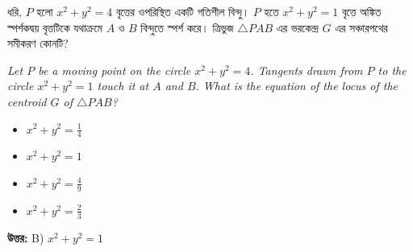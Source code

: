 \documentclass[12pt, a4paper]{article}
\begin{document}
\vspace{2em}

\begin{tcolorbox}[questionbox={প্রশ্ন (Question) 28}]
    \noindent
    ধরি, $P$ হলো $x^2 + y^2 = 4$ বৃত্তের ওপরিস্থিত একটি গতিশীল বিন্দু। $P$ হতে $x^2 + y^2 = 1$ বৃত্তে অঙ্কিত স্পর্শকদ্বয় বৃত্তটিকে যথাক্রমে $A$ ও $B$ বিন্দুতে স্পর্শ করে। ত্রিভুজ $\triangle PAB$ এর ভরকেন্দ্র $G$ এর সঞ্চারপথের সমীকরণ কোনটি?
    
    \vspace{0.8em}
    \begin{english}
    \noindent\textit{\color{darkgray}
    Let $P$ be a moving point on the circle $x^2 + y^2 = 4$. Tangents drawn from $P$ to the circle $x^2 + y^2 = 1$ touch it at $A$ and $B$. What is the equation of the locus of the centroid $G$ of $\triangle PAB$?
    }
    \end{english}
\end{tcolorbox}

\begin{itemize}[label={}, leftmargin=1cm, itemsep=0.5em]
    \item[\textbf{A)}] $x^2 + y^2 = \frac{1}{4}$
    \item[\textbf{B)}] $x^2 + y^2 = 1$
    \item[\textbf{C)}] $x^2 + y^2 = \frac{4}{9}$
    \item[\textbf{D)}] $x^2 + y^2 = \frac{2}{3}$
\end{itemize}

\vspace{0.5em}
\begin{tcolorbox}[answerbox]
    \textbf{\color{success} উত্তর:} B) $x^2 + y^2 = 1$
\end{tcolorbox}
\vspace{1em}
\end{document}

